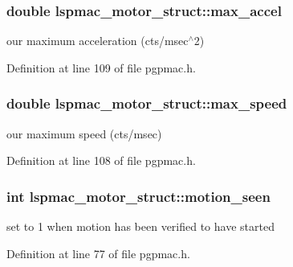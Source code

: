 \hypertarget{structlspmac__motor__struct_afec8dc1d4b97ba9c1d6e4f7a088342e4}{
\subsubsection[{max\-\_\-accel}]{\setlength{\rightskip}{0pt plus 5cm}double lspmac\-\_\-motor\-\_\-struct\-::max\-\_\-accel}}\label{structlspmac__motor__struct_afec8dc1d4b97ba9c1d6e4f7a088342e4}


our maximum acceleration (cts/msec$^\wedge$2) 



Definition at line 109 of file pgpmac.\-h.

\hypertarget{structlspmac__motor__struct_af27159eeef80e4438446e01f24fae9d5}{
\subsubsection[{max\-\_\-speed}]{\setlength{\rightskip}{0pt plus 5cm}double lspmac\-\_\-motor\-\_\-struct\-::max\-\_\-speed}}\label{structlspmac__motor__struct_af27159eeef80e4438446e01f24fae9d5}


our maximum speed (cts/msec) 



Definition at line 108 of file pgpmac.\-h.

\hypertarget{structlspmac__motor__struct_a68c471836f52707fa8582f7860cf500f}{
\subsubsection[{motion\-\_\-seen}]{\setlength{\rightskip}{0pt plus 5cm}int lspmac\-\_\-motor\-\_\-struct\-::motion\-\_\-seen}}\label{structlspmac__motor__struct_a68c471836f52707fa8582f7860cf500f}


set to 1 when motion has been verified to have started 



Definition at line 77 of file pgpmac.\-h.

